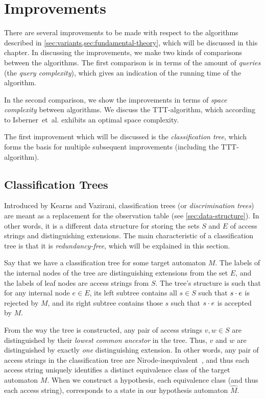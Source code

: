 \documentclass[multi,crop=false,class=article]{standalone}
\begin{document}
\section{Improvements}
\label{sec:improvements}
There are several improvements to be made with respect to the algorithms
described in \cref{sec:variants,sec:fundamental-theory}, which will be discussed
in this chapter. In discussing the improvements, we make two kinds of
comparisons between the algorithms. The first comparison is in terms of the
amount of \textit{queries} (the \textit{query complexity}), which gives an
indication of the running time of the algorithm.

In the second comparison, we show the improvements in terms of \textit{space
  complexity} between algorithms. We discuss the TTT-algorithm, which according
to Isberner~et~al. exhibits an optimal space complexity\cite{Isberner14b}.

The first improvement which will be discussed is the \textit{classification
  tree}, which forms the basis for multiple subsequent improvements (including
the TTT-algorithm).

\subsection{Classification Trees}
\label{sec:classification-trees}
Introduced by Kearns and Vazirani\cite{Kearns94}, classification trees (or
\textit{discrimination trees}) are meant as a replacement for the observation
table (see \cref{sec:data-structure}). In other words, it is a different data
structure for storing the sets $S$ and $E$ of access strings and distinguishing
extensions. The main characteristic of a classification tree is that it is
\textit{redundancy-free}, which will be explained in this section.

Say that we have a classification tree for some target automaton $M$. The labels
of the internal nodes of the tree are distinguishing extensions from the set
$E$, and the labels of leaf nodes are access strings from $S$. The tree's
structure is such that for any internal node $e \in E$, its left subtree
contains all $s \in S$ such that $s \cdot e$ is rejected by $M$, and its right
subtree contains those $s$ such that $s \cdot e$ is accepted by $M$.

From the way the tree is constructed, any pair of access strings $v,w \in S$ are
distinguished by their \textit{lowest common ancestor} in the tree. Thus, $v$
and $w$ are distinguished by exactly \textit{one} distinguishing extension. In
other words, any pair of access strings in the classification tree are
Nirode-inequivalent~, and thus each access
string uniquely identifies a distinct equivalence class of the target automaton
$M$. When we construct a hypothesis, each equivalence class (and thus each
access string), corresponds to a state in our hypothesis automaton $\hat M$.
\end{document}
